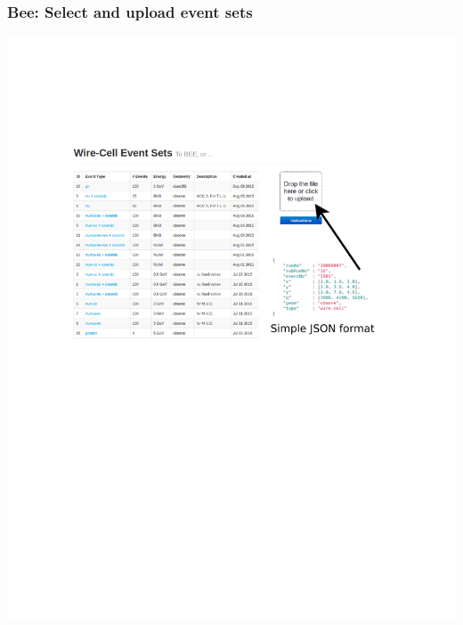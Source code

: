 \documentclass[xcolor=dvipsnames]{beamer}
\begin{document}
\begin{frame}[fragile]
  \frametitle{Bee: Select and upload event sets}
  \begin{center}
    \vspace{-5mm}

    \includegraphics[height=\textheight,trim=3cm 12cm 3cm 5cm,clip]{bee-upload-page.pdf}
  \end{center}
\end{frame}
\end{document}

